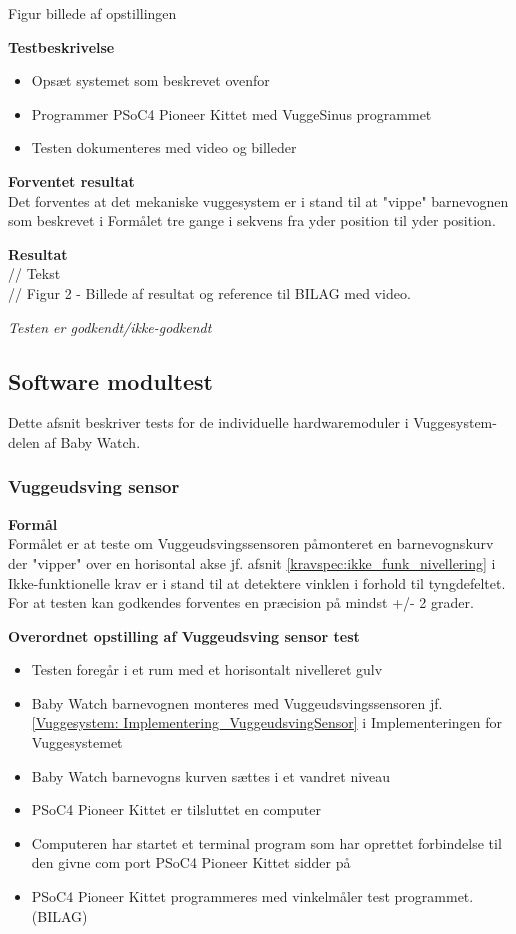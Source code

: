 Figur billede af opstillingen

\textbf{Testbeskrivelse}
\begin{itemize}
	\item Opsæt systemet som beskrevet ovenfor
	\item Programmer PSoC4 Pioneer Kittet med VuggeSinus programmet
	\item Testen dokumenteres med video og billeder
\end{itemize}

\textbf{Forventet resultat} \\
Det forventes at det mekaniske vuggesystem er i stand til at "vippe" barnevognen som beskrevet i Formålet tre gange i sekvens fra yder position til yder position.

\textbf{Resultat} \\
// Tekst \\

// Figur 2 - Billede af resultat og reference til BILAG med video.

\textit{Testen er godkendt/ikke-godkendt}




\subsection{Software modultest}
Dette afsnit beskriver tests for de individuelle hardwaremoduler i Vuggesystem-delen af Baby Watch.
\subsubsection{Vuggeudsving sensor}
\textbf{Formål} \\
Formålet er at teste om Vuggeudsvingssensoren påmonteret en barnevognskurv der "vipper" over en horisontal akse jf. afsnit \ref{kravspec:ikke_funk_nivellering} i Ikke-funktionelle krav er i stand til at detektere vinklen i forhold til tyngdefeltet. For at testen kan godkendes forventes en præcision på mindst +/- 2 grader.

\textbf{Overordnet opstilling af Vuggeudsving sensor test}

\begin{itemize}
		\item Testen foregår i et rum med et horisontalt nivelleret gulv
	\item Baby Watch barnevognen monteres med Vuggeudsvingssensoren jf.\ref{Vuggesystem: Implementering_VuggeudsvingSensor} i Implementeringen for Vuggesystemet 
	\item Baby Watch barnevogns kurven sættes i et vandret niveau
	\item PSoC4 Pioneer Kittet er tilsluttet en computer
	\item Computeren har startet et terminal program som har oprettet forbindelse til den givne com port PSoC4 Pioneer Kittet sidder på
	\item PSoC4 Pioneer Kittet programmeres med vinkelmåler test programmet. (BILAG)
\end{itemize}

